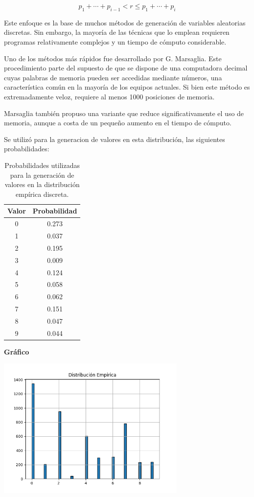 \documentclass[11pt]{article}
\begin{document}
\begin{equation}
p_1 + \cdots + p_{i-1} < r \leq p_1 + \cdots + p_i
\end{equation}


Este enfoque es la base de muchos métodos de generación de variables aleatorias discretas. Sin embargo, la mayoría de las técnicas que lo emplean requieren programas relativamente complejos y un tiempo de cómputo considerable.

Uno de los métodos más rápidos fue desarrollado por G. Marsaglia. Este procedimiento parte del supuesto de que se dispone de una computadora decimal cuyas palabras de memoria pueden ser accedidas mediante números, una característica común en la mayoría de los equipos actuales. Si bien este método es extremadamente veloz, requiere al menos 1000 posiciones de memoria.

Marsaglia también propuso una variante que reduce significativamente el uso de memoria, aunque a costa de un pequeño aumento en el tiempo de cómputo.

Se utilizó para la generacion de valores en esta distribución, las siguientes probabilidades:

\begin{table}[H]
\centering
\begin{tabular}{|c|c|}
\hline
\textbf{Valor} & \textbf{Probabilidad} \\
\hline
0 & 0.273 \\
1 & 0.037 \\
2 & 0.195 \\
3 & 0.009 \\
4 & 0.124 \\
5 & 0.058 \\
6 & 0.062 \\
7 & 0.151 \\
8 & 0.047 \\
9 & 0.044 \\
\hline
\end{tabular}
\caption{Probabilidades utilizadas para la generación de valores en la distribución empírica discreta.}
\label{tab:empirica}
\end{table}

\noindent\textbf{Gráfico\newline}
\begin{center}
\includegraphics[width=0.7\textwidth]{Images/histograma_empirica.png}

\end{center}
\end{document}
